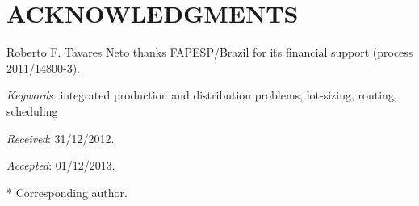 \section*{ACKNOWLEDGMENTS}
\par Roberto F. Tavares Neto thanks FAPESP/Brazil for its financial support (process
 2011/14800-3).

\medskip\par\noindent
\footnotesize{\textit{Keywords}: integrated production and distribution problems, lot-sizing, routing, scheduling}
\medskip\par\noindent
\footnotesize{\textit{Received}: 31/12/2012.} \par \noindent
\footnotesize{\textit{Accepted}: 01/12/2013.} \medskip\par\noindent
\footnotesize{*
				Corresponding author.
}
\balance
\pagebreak\onecolumn
